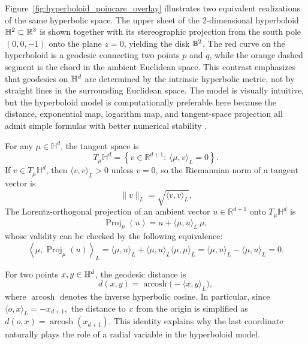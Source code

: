 \documentclass[11pt]{article}
\begin{document}
Figure~\ref{fig:hyperboloid_poincare_overlay} illustrates two equivalent realizations of the same hyperbolic space. The upper sheet of the 2-dimensional hyperboloid $\mathbb{H}^2 \subset \mathbb{R}^3$ is shown together with its stereographic projection from the south pole \((0,0,-1)\) onto the plane \(z=0\), yielding the \Poincare disk $\mathbb{B}^2$. The red curve on the hyperboloid is a geodesic connecting two points \(p\) and \(q\), while the orange dashed segment is the chord in the ambient Euclidean space. This contrast emphasizes that geodesics on \(\mathbb{H}^d\) are determined by the intrinsic hyperbolic metric, not by straight lines in the surrounding Euclidean space. The \Poincare model is visually intuitive, but the hyperboloid model is computationally preferable here because the distance, exponential map, logarithm map, and tangent-space projection all admit simple formulas with better numerical stability \citep{mishne_2023_NumericalStabilityHyperbolic}. 


For any \(\mu\in\mathbb{H}^d\), the tangent space is
\begin{equation}\label{eq:bg_tangent}
T_\mu\mathbb{H}^d
=
\left\{
v\in\mathbb{R}^{d+1}:\ \langle \mu,v\rangle_L=0
\right\}.
\end{equation}
If \(v\in T_\mu\mathbb{H}^d\), then \(\langle v,v\rangle_L>0\) unless \(v=0\), so the Riemannian norm of a tangent vector is
\begin{equation}\label{eq:bg_tangent_norm}
\|v\|_L=\sqrt{\langle v,v\rangle_L}.
\end{equation}
The Lorentz-orthogonal projection of an ambient vector \(u\in\mathbb{R}^{d+1}\) onto \(T_\mu\mathbb{H}^d\) is
\begin{equation}\label{eq:bg_projection}
\operatorname{Proj}_\mu(u)
=
u+\langle \mu,u\rangle_L\,\mu,
\end{equation}
whose validity can be checked by the following equivalence:
\[
\left\langle \mu,\operatorname{Proj}_\mu(u)\right\rangle_L
=
\langle \mu,u\rangle_L+\langle \mu,u\rangle_L\langle \mu,\mu\rangle_L
=
\langle \mu,u\rangle_L-\langle \mu,u\rangle_L
=
0.
\]

For two points $x,y \in \mathbb{H}^d$, the geodesic distance is
\begin{equation}\label{eq:bg_distance}
d(x,y)= \operatorname{arcosh}\bigl(-\langle x,y\rangle_L\bigr),
\end{equation}
where \(\operatorname{arcosh}\) denotes the inverse hyperbolic cosine. In particular, since
$\langle o,x\rangle_L=-x_{d+1},$ the distance to $x$ from the origin is simplified as $d(o,x)=\operatorname{arcosh}(x_{d+1})$. This identity explains why the last coordinate naturally plays the role of a radial variable in the hyperboloid model.
\end{document}
